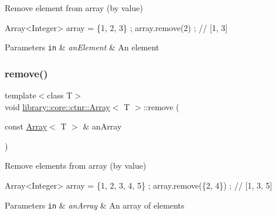 Remove element from array (by value) 


\begin{DoxyCode}
Array<Integer> array = \{1, 2, 3\} ;
array.remove(2) ; \textcolor{comment}{// [1, 3]}
\end{DoxyCode}



\begin{DoxyParams}[1]{Parameters}
\mbox{\tt in}  & {\em an\+Element} & An element \\
\hline
\end{DoxyParams}
\mbox{\label{classlibrary_1_1core_1_1ctnr_1_1Array_ab37ca6fc14eefd1336544e05ba1b4d0e}} 
\subsubsection{\texorpdfstring{remove()}{remove()}\hspace{0.1cm}{\footnotesize\ttfamily [2/2]}}
{\footnotesize\ttfamily template$<$class T$>$ \\
void \hyperlink{classlibrary_1_1core_1_1ctnr_1_1Array}{library\+::core\+::ctnr\+::\+Array}$<$ T $>$\+::remove (\begin{DoxyParamCaption}\item[{const \hyperlink{classlibrary_1_1core_1_1ctnr_1_1Array}{Array}$<$ T $>$ \&}]{an\+Array }\end{DoxyParamCaption})}



Remove elements from array (by value) 


\begin{DoxyCode}
Array<Integer> array = \{1, 2, 3, 4, 5\} ;
array.remove(\{2, 4\}) ; \textcolor{comment}{// [1, 3, 5]}
\end{DoxyCode}



\begin{DoxyParams}[1]{Parameters}
\mbox{\tt in}  & {\em an\+Array} & An array of elements \\
\hline
\end{DoxyParams}
\mbox{\label{classlibrary_1_1core_1_1ctnr_1_1Array_a322b1bfc3a93ea18bf68eb0cff69e6d3}} 
